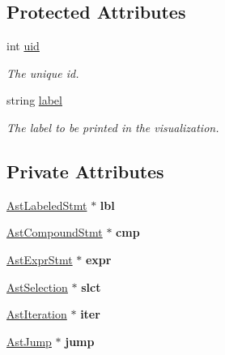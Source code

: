 \subsection*{Protected Attributes}
\begin{DoxyCompactItemize}
\item 
\hypertarget{classAST_a847b778f1c3dd5a19de32de432ee6e15}{int \hyperlink{classAST_a847b778f1c3dd5a19de32de432ee6e15}{uid}}\label{classAST_a847b778f1c3dd5a19de32de432ee6e15}

\begin{DoxyCompactList}\small\item\em The unique id. \end{DoxyCompactList}\item 
\hypertarget{classAST_ab2e239ccc0688d2341724432ff5a1a31}{string \hyperlink{classAST_ab2e239ccc0688d2341724432ff5a1a31}{label}}\label{classAST_ab2e239ccc0688d2341724432ff5a1a31}

\begin{DoxyCompactList}\small\item\em The label to be printed in the visualization. \end{DoxyCompactList}\end{DoxyCompactItemize}
\subsection*{Private Attributes}
\begin{DoxyCompactItemize}
\item 
\hypertarget{classAstStatement_ad6a4880790177b9c482e679ca57a4fbe}{\hyperlink{classAstLabeledStmt}{Ast\-Labeled\-Stmt} $\ast$ {\bfseries lbl}}\label{classAstStatement_ad6a4880790177b9c482e679ca57a4fbe}

\item 
\hypertarget{classAstStatement_a7cb384c83f44a76c7839e70e2d5ff8d1}{\hyperlink{classAstCompoundStmt}{Ast\-Compound\-Stmt} $\ast$ {\bfseries cmp}}\label{classAstStatement_a7cb384c83f44a76c7839e70e2d5ff8d1}

\item 
\hypertarget{classAstStatement_ad25436faed941dc5cf1d278e1244ff7e}{\hyperlink{classAstExprStmt}{Ast\-Expr\-Stmt} $\ast$ {\bfseries expr}}\label{classAstStatement_ad25436faed941dc5cf1d278e1244ff7e}

\item 
\hypertarget{classAstStatement_ac9d31035cc8dbbdce5fedac012c7cc39}{\hyperlink{classAstSelection}{Ast\-Selection} $\ast$ {\bfseries slct}}\label{classAstStatement_ac9d31035cc8dbbdce5fedac012c7cc39}

\item 
\hypertarget{classAstStatement_ab14e3739f049760d6c094dd15526f65f}{\hyperlink{classAstIteration}{Ast\-Iteration} $\ast$ {\bfseries iter}}\label{classAstStatement_ab14e3739f049760d6c094dd15526f65f}

\item 
\hypertarget{classAstStatement_abc6af3b0d2a6618803c3ccdbebcc42a8}{\hyperlink{classAstJump}{Ast\-Jump} $\ast$ {\bfseries jump}}\label{classAstStatement_abc6af3b0d2a6618803c3ccdbebcc42a8}

\end{DoxyCompactItemize}


